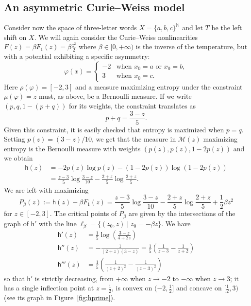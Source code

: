 \documentclass[AHL, Unicode, longabstracts,published]{cedram}
\theoremstyle{plain}
\theoremstyle{plain}
\newcommand{\hf}{\mathsf{h}}
\newcommand{\pot}{\varphi}
\newcommand*\8{\infty}
\newcommand\NN{\mathbb{N}}
\newcommand{\cM}{\mathcal{M}}
\begin{document}
\subsection{An asymmetric Curie--Weiss model}\label{sec-metastable}

Consider now the space of three-letter words $X=\{a,b,c\}^{\NN}$ and let $T$ be the left shift on $X$. We will again consider the Curie--Weiss nonlinearities $F(z) = \beta F_1(z) = \beta\frac{z^2}{2}$ where $\beta\in[0,+\infty)$ is the inverse of the temperature, but with a potential exhibiting a specific asymmetry:
\[
\pot(x) =
\begin{cases}
-2 &\text{when }x_0=a \text{ or }x_0=b,\\
3 &\text{when }x_0=c.
\end{cases}
\]
Here $\rho(\pot)=[-2,3]$ and a measure maximizing entropy under the constraint $\mu(\pot)=z$ must, as above, be a Bernoulli measure. If we write $(p,q,1-(p+q))$ for its weights, the constraint translates as
\begin{equation}
p+q = \frac{3-z}{5}.
\end{equation}
Given this constraint, it is easily checked that entropy is maximized when $p=q$. Setting $p(z) = (3-z)/10$, we get that the measure in $\cM(z)$ maximizing entropy is the Bernoulli measure with weights $(p(z),p(z),1-2p(z))$ and we obtain
\begin{align*}
\hf(z) &= -2p(z)\log p(z)-(1-2p(z))\log(1-2p(z)) \\
&= \frac{z-3}{5} \log\frac{3-z}{10}-\frac{2+z}{5}\log \frac{2+z}{5}.
\end{align*}
We are left with maximizing
\[
P_\beta(z) := \hf(z)+\beta F_1(z) = \frac{z-3}{5} \log\frac{3-z}{10}-\frac{2+z}{5}\log \frac{2+z}{5} +\frac12\beta z^2
\]
for $z\in[-2,3]$. The critical points of $P_\beta$ are given by the intersections of the graph of $\hf'$ with the line $\ell_\beta=\{(z_0,z)\mid z_0=-\beta z\}$. We have
\begin{align*}
\hf'(z) &= \frac{1}{5} \log\left(\frac{3-z}{4+2z} \right) \\
\hf''(z) &= -\frac{1}{(2+z)(3-z)} = \frac15\left(\frac{1}{z-3} -\frac{1}{z+2} \right) \\
\hf'''(z) &= \frac15\left(\frac{1}{(z+2)^2} -\frac{1}{(z-3)^2} \right)
\end{align*}
so that $\hf'$ is strictly decreasing, from $+\infty$ when $z\to-2$ to $-\infty$ when $z\to 3$; it has a single inflection point at $z=\frac12$, is convex on $(-2,\frac12]$ and concave on $[\frac12,3)$ (see its graph in Figure~\ref{fig:hprime}).
\end{document}
